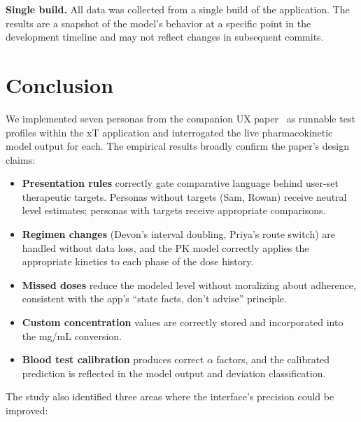 \documentclass[11pt,a4paper]{article}
\begin{document}
\textbf{Single build.} All data was collected from a single build of the
application. The results are a snapshot of the model's behavior at a
specific point in the development timeline and may not reflect changes in
subsequent commits.

\section{Conclusion}
\label{sec:conclusion}

We implemented seven personas from the companion UX paper~\cite{xtux} as
runnable test profiles within the xT application and interrogated the live
pharmacokinetic model output for each. The empirical results broadly confirm
the paper's design claims:

\begin{itemize}[nosep,leftmargin=1.4em]
\item \textbf{Presentation rules} correctly gate comparative language behind
  user-set therapeutic targets. Personas without targets (Sam, Rowan)
  receive neutral level estimates; personas with targets receive appropriate
  comparisons.
\item \textbf{Regimen changes} (Devon's interval doubling, Priya's route
  switch) are handled without data loss, and the PK model correctly applies
  the appropriate kinetics to each phase of the dose history.
\item \textbf{Missed doses} reduce the modeled level without moralizing
  about adherence, consistent with the app's ``state facts, don't advise''
  principle.
\item \textbf{Custom concentration} values are correctly stored and
  incorporated into the mg/mL conversion.
\item \textbf{Blood test calibration} produces correct $\alpha$ factors,
  and the calibrated prediction is reflected in the model output and
  deviation classification.
\end{itemize}

The study also identified three areas where the interface's precision could
be improved:
\end{document}
